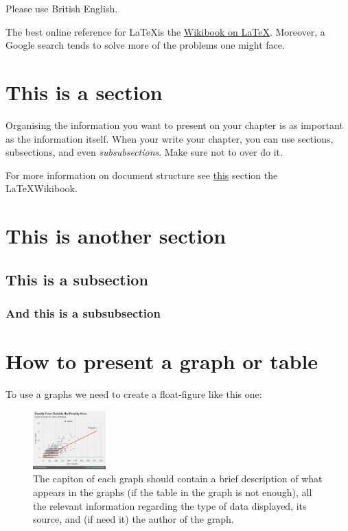 \documentclass[11pt,a4paper,oneside]{book}
\newcommand{\latex}{\LaTeX{}} %
\begin{document}
Please use British English.

The best online reference for \latex is the \href{https://en.wikibooks.org/wiki/LaTeX}{Wikibook on \latex}. Moreover, a Google search tends to solve more of the problems one might face.

\section{This is a section}
\label{sec:document_structure}
Organising the information you want to present on your chapter is as important as the information itself. When your write your chapter, you can use sections, subsections, and even \textit{subsubsections}. Make sure not to over do it.

For more information on document structure see \href{https://en.wikibooks.org/wiki/LaTeX/Document_Structure}{this} section the \latex Wikibook.
\section{This is another section}
\subsection{This is a subsection}
\subsubsection{And this is a subsubsection}

\section{How to present a graph or table}
\label{sec:floats}
To use a graphs we need to create a float-figure like this one:
\begin{figure}[h!]
  \centering
    \includegraphics[width=0.25\textwidth]{example}
    \caption{The capiton of each graph should contain a brief description of what appears in the graphs (if the table in the graph is not enough), all the relevant information regarding the type of data displayed, its source, and (if need it) the author of the graph.}
    \label{fig:messi_vs_ronaldo}
\end{figure}
\end{document}
